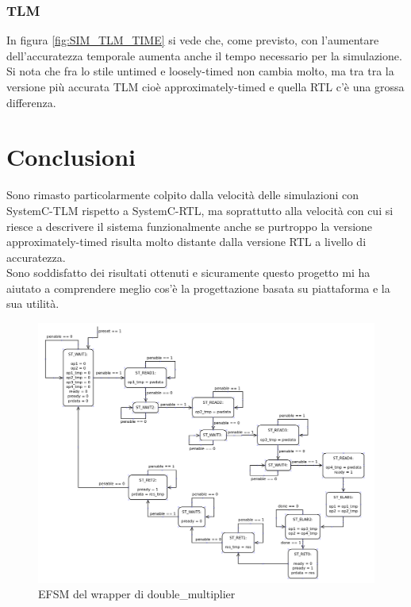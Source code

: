 \documentclass[]{IEEEtran}
\begin{document}
\subsubsection{TLM}
In figura \ref{fig:SIM_TLM_TIME} si vede che, come previsto, con l'aumentare dell'accuratezza temporale aumenta anche il tempo necessario per la simulazione. Si nota che fra lo stile untimed e loosely-timed non cambia molto, ma tra tra la versione più accurata TLM cioè approximately-timed e quella RTL c'è una grossa differenza.



\section{Conclusioni}
Sono rimasto particolarmente colpito dalla velocità delle simulazioni con SystemC-TLM rispetto a SystemC-RTL, ma soprattutto alla velocità con cui si riesce a descrivere il sistema funzionalmente anche se purtroppo la versione approximately-timed risulta molto distante dalla versione RTL a livello di accuratezza.
\\Sono soddisfatto dei risultati ottenuti e sicuramente questo progetto mi ha aiutato a comprendere meglio cos'è la progettazione basata su piattaforma e la sua utilità.



\nocite{*}


\appendix


\begin{figure}[bt]
    \centering
    \includegraphics[width=\textwidth]{figures/EFSM_wrapper.png}
    \caption{EFSM del wrapper di double\_multiplier}
    \label{fig:EFSM_WRAPPER}
\end{figure}
\end{document}
